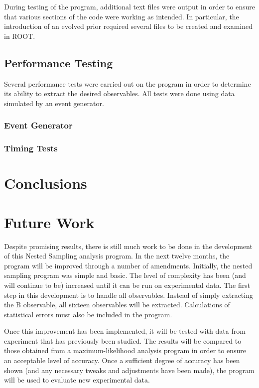 \documentclass[a4paper,12pt]{article}
\begin{document}
During testing of the program, additional text files were output in order to ensure that various sections of the code were working as intended.  In particular, the introduction of an evolved prior required several files to be created and examined in ROOT.


\subsection{Performance Testing}
Several performance tests were carried out on the program in order to determine its ability to extract the desired observables.  All tests were done using data simulated by an event generator.
\subsubsection{Event Generator}
\subsubsection{Timing Tests}


\section{Conclusions}
\newpage

\section{Future Work}

Despite promising results, there is still much work to be done in the development of this Nested Sampling analysis program.  In the next twelve months, the program will be improved through a number of amendments.  Initially, the nested sampling program was simple and basic.  The level of complexity has been (and will continue to be) increased until it can be run on experimental data.  
The first step in this development is to handle all observables.  Instead of simply extracting the B observable, all sixteen observables will be extracted.  Calculations of statistical errors must also be included in the program.

Once this improvement has been implemented, it will be tested with data from experiment that has previously been studied.  The results will be compared to those obtained from a maximum-likelihood analysis program in order to ensure an acceptable level of accuracy. Once a sufficient degree of accuracy has been shown (and any necessary tweaks and adjustments have been made), the program will be used to evaluate new experimental data.
\end{document}

